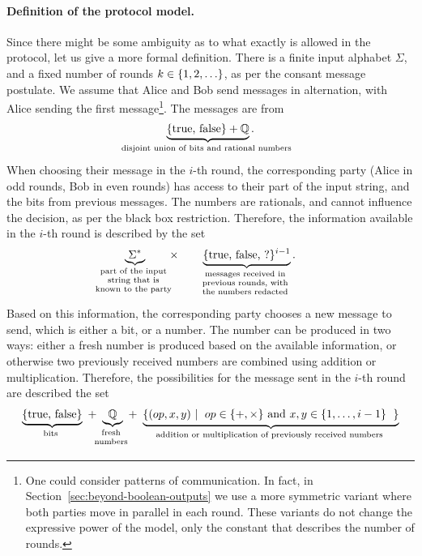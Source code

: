 \paragraph*{Definition of the protocol model.} Since there might be some ambiguity as to what exactly is allowed in the protocol, let us give a more formal  definition. There is a finite input alphabet $\Sigma$, and a fixed number of rounds $k \in \{1,2,\ldots\}$, as per the consant message postulate. We assume that  Alice and Bob send messages in alternation, with Alice sending the first message\footnote{One could consider patterns of communication. In fact, in Section~\ref{sec:beyond-boolean-outputs} we use a more symmetric variant where both parties move in parallel in each round. These variants  do not change the expressive power of the model, only the constant that describes the  number of rounds.}. The messages are from 
\begin{align*}
\myunderbrace{\set{\text{true, false}} + \Rat}{disjoint union of bits and rational numbers}.
\end{align*}
When choosing their message in the $i$-th round, the corresponding  party (Alice in odd rounds, Bob in even rounds) has access to their part of the input string, and the  bits from previous messages. The numbers  are rationals, and cannot influence the decision, as per the black box restriction.  Therefore, the information available  in the $i$-th round is described by  the set 
\begin{align}\label{eq:strategy-input}
\myunderbrace{\Sigma^*}{part of the  input \\ string that is \\ known to the party}
\qquad \times \qquad 
\myunderbrace{\set{\text{true, false, ?}}^{i-1}}{messages received in \\ previous rounds, with \\ the numbers redacted}.
\end{align}
Based on this information, the corresponding party chooses a new message to  send, which is either a bit, or a number. The number can be produced in two ways: either  a  fresh number  is produced based on the available information, or otherwise two previously received numbers are combined using addition or multiplication.  Therefore, the possibilities for the message sent in the $i$-th round are described  the set 
\begin{align}
    \label{eq:strategy-output}
\myunderbrace{\set{\text{true, false}}}{bits}
\ + \ 
\myunderbrace{\Rat}{fresh \\ numbers}
\  + \ 
\myunderbrace{\setbuild{(op,x,y)}{$op \in \set{+,\times}$ and $x,y \in \set{1,\ldots,i-1}$}}{addition or multiplication of previously received numbers}
\end{align}

